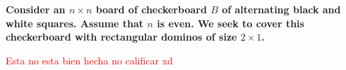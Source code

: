 \textbf{Consider an $n \times n$ board of checkerboard $B$ of alternating black and white squares. Assume that $n$ is even. We seek to cover this checkerboard with rectangular dominos of size $2 \times 1$.}\vspace{.2cm}

\textcolor{red}{Esta no esta bien hecha no calificar xd}